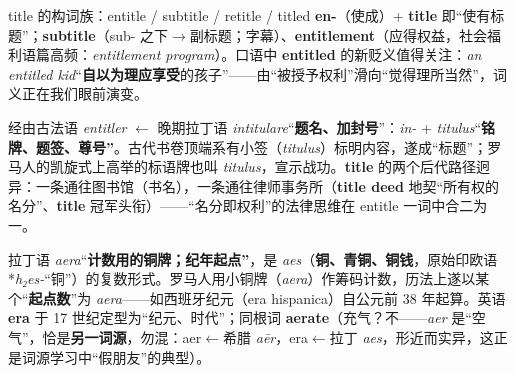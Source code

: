 \documentclass[../main.tex]{subfiles}
\begin{document}

\begin{gram}{title 的构词族：entitle / subtitle / retitle / titled}
\textbf{en-}（使成）+ \textbf{title} 即“使有标题”；\textbf{subtitle}（sub- 之下$\to$副标题；字幕）、\textbf{entitlement}（应得权益，社会福利语篇高频：\textit{entitlement program}）。口语中 \textbf{entitled} 的新贬义值得关注：\textit{an entitled kid}“\textbf{自以为理应享受}的孩子”——由“被授予权利”滑向“觉得理所当然”，词义正在我们眼前演变。
\end{gram}

\begin{origin}
经由古法语 \textit{entitler} $\leftarrow$ 晚期拉丁语 \textit{intitulare}“\textbf{题名、加封号}”：\textit{in-} + \textit{titulus}“\textbf{铭牌、题签、尊号”}。古代书卷顶端系有小签（\textit{titulus}）标明内容，遂成“标题”；罗马人的凯旋式上高举的标语牌也叫 \textit{titulus}，宣示战功。\textbf{title} 的两个后代路径迥异：一条通往图书馆（书名），一条通往律师事务所（\textbf{title deed} 地契“所有权的名分”、\textbf{title} 冠军头衔）——“名分即权利”的法律思维在 entitle 一词中合二为一。
\end{origin}



\begin{origin}
拉丁语 \textit{aera}“\textbf{计数用的铜牌；纪年起点”}，是 \textit{aes}（\textbf{铜、青铜、铜钱}，原始印欧语 *\textit{h₂es-}“铜”）的复数形式。罗马人用小铜牌（\textit{aera}）作筹码计数，历法上遂以某个“\textbf{起点数}”为 \textit{aera}——如西班牙纪元（era hispanica）自公元前 38 年起算。英语 \textbf{era} 于 17 世纪定型为“纪元、时代”；同根词 \textbf{aerate}（充气？不——\textit{aer} 是“空气”，恰是\textbf{另一词源}，勿混：aer$\leftarrow$希腊 \textit{aēr}，era$\leftarrow$拉丁 \textit{aes}，形近而实异，这正是词源学习中“假朋友”的典型）。
\end{origin}


\end{document}
